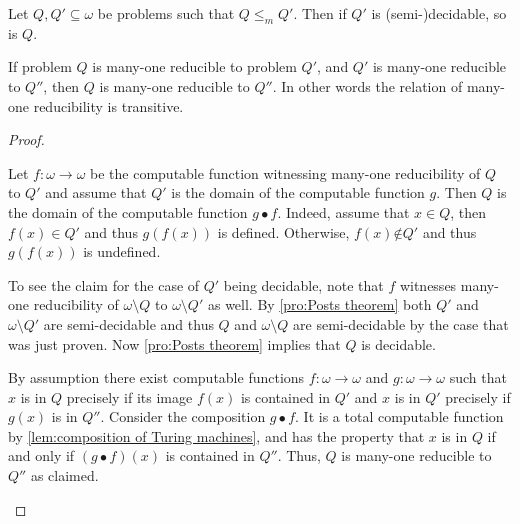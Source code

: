 \begin{pro}\label{pro:m reducibility and decidability}
  \begin{thmlist}
    \item Let \(Q, Q' \subseteq ω\) be problems such that \(Q ≤_m Q'\). Then if
    \(Q'\) is \hbox{(semi-)}decidable, so is \(Q\).

    \item If problem \(Q\) is many-one reducible to problem \(Q'\), and \(Q'\)
    is many-one reducible to \(Q''\), then \(Q\) is many-one reducible to
    \(Q''\). In other words the relation of many-one reducibility is transitive.
  \end{thmlist}
\end{pro}
\begin{proof}
  \begin{plist}
    \item   Let \(f: ω → ω\) be the computable function witnessing many-one
    reducibility of \(Q\) to \(Q'\) and assume that \(Q'\) is the domain of the
    computable function \(g\). Then \(Q\) is the domain of the computable
    function \(g • f\). Indeed, assume that \(x ∈ Q\), then \(f(x) ∈ Q'\) and
    thus \(g(f(x))\) is defined. Otherwise, \(f(x) \not∈ Q'\) and thus
    \(g(f(x))\) is undefined.

    To see the claim for the case of \(Q'\) being decidable, note that \(f\)
    witnesses many-one reducibility of \(ω \setminus Q\) to \(ω \setminus Q'\)
    as well. By \cref{pro:Posts theorem} both \(Q'\) and \(ω \setminus Q'\) are
    semi-decidable and thus \(Q\) and \(ω \setminus Q\) are semi-decidable by
    the case that was just proven. Now \cref{pro:Posts theorem} implies that
    \(Q\) is decidable.

    \item By assumption there exist computable functions \(f: ω → ω\) and \(g:
    ω → ω\) such that \(x\) is in \(Q\) precisely if its image \(f(x)\) is
    contained in \(Q'\) and \(x\) is in \(Q'\) precisely if \(g(x)\) is in
    \(Q''\). Consider the composition \(g • f\). It is a total computable
    function by \cref{lem:composition of Turing machines}, and has the property
    that \(x\) is in \(Q\) if and only if \((g • f)(x)\) is contained in
    \(Q''\). Thus, \(Q\) is many-one reducible to \(Q''\) as claimed.
  \end{plist}
\end{proof}
